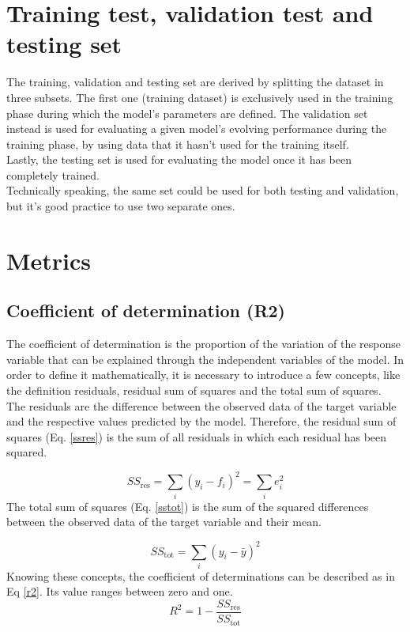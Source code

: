 \section{Training test, validation test and testing set}
The training, validation and testing set are derived by splitting the dataset in three subsets. The first one (training dataset) is exclusively used in the training phase during which the model’s parameters are defined.
The validation set instead is used for evaluating a given model’s evolving performance during the training phase, by using data that it hasn’t used for the training itself.
\\Lastly, the testing set is used for evaluating the model once it has been completely trained. 
\\Technically speaking, the same set could be used for both testing and validation, but it’s good practice to use two separate ones.


\section{Metrics}
\subsection{Coefficient of determination (R2)}
The coefficient of determination \autocite{RossStat} is the proportion of the variation of the response variable that can be explained through the independent variables of the model.
In order to define it mathematically, it is necessary to introduce a few concepts, like the definition residuals, residual sum of squares and the total sum of squares.
\\The residuals are the difference between the observed data of the target variable and the respective values predicted by the model. Therefore, the residual sum of squares (Eq. \eqref{ssres}) is the sum of all residuals in which each residual has been squared.

\begin{equation}
S S_{\mathrm{res}}=\sum_{i}\left(y_{i}-f_{i}\right)^{2}=\sum_{i} e_{i}^{2}
\label{ssres}
\end{equation}
The total sum of squares (Eq. \eqref{sstot}) is the sum of the squared differences between the observed data of the target variable and their mean.

\begin{equation}
S S_{\mathrm{tot}}=\sum_{i}\left(y_{i}-\bar{y}\right)^{2}
\label{sstot}
\end{equation}
Knowing these concepts, the coefficient of determinations can be described as in Eq \eqref{r2}. Its value ranges between zero and one.
\begin{equation}
R^{2}=1-\frac{S S_{\mathrm{res}}}{S S_{\mathrm{tot}}}
\label{r2}
\end{equation}

